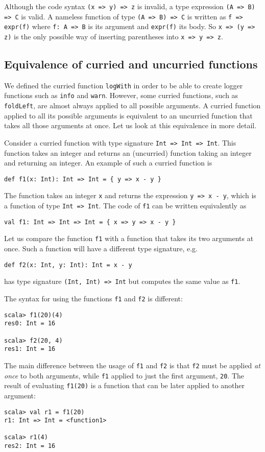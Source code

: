 Although the code syntax \lstinline!(x => y) => z! is invalid, a
type expression \lstinline!(A => B) => C! is valid. A nameless function
of type \lstinline!(A => B) => C! is written as \lstinline!f => expr(f)!
where \lstinline!f: A => B! is its argument and \lstinline!expr(f)!
its body. So \lstinline!x => (y => z)! is the only possible way of
inserting parentheses into \lstinline!x => y => z!.

\subsection{Equivalence of curried and uncurried functions}

We defined the curried function \lstinline!logWith! in order to be
able to create logger functions such as \lstinline!info! and \lstinline!warn!.
However, some curried functions, such as \lstinline!foldLeft!, are
almost always applied to all possible arguments. A curried function
applied to all its possible arguments is equivalent to an uncurried
function that takes all those arguments at once. Let us look at this
equivalence in more detail.

Consider a curried function with type signature \lstinline!Int => Int => Int!.
This function takes an integer and returns an (uncurried) function
taking an integer and returning an integer. An example of such a curried
function is
\begin{lstlisting}
def f1(x: Int): Int => Int = { y => x - y }
\end{lstlisting}

The function takes an integer \lstinline!x! and returns the expression
\lstinline!y => x - y!, which is a function of type \lstinline!Int => Int!.
The code of \lstinline!f1! can be written equivalently as
\begin{lstlisting}
val f1: Int => Int => Int = { x => y => x - y }
\end{lstlisting}

Let us compare the function \lstinline!f1! with a function that takes
its two arguments at once. Such a function will have a different type
signature, e.g.
\begin{lstlisting}
def f2(x: Int, y: Int): Int = x - y
\end{lstlisting}
has type signature \lstinline!(Int, Int) => Int! but computes the
same value as \lstinline!f1!.

The syntax for using the functions \lstinline!f1! and \lstinline!f2!
is different:
\begin{lstlisting}
scala> f1(20)(4)
res0: Int = 16

scala> f2(20, 4)
res1: Int = 16
\end{lstlisting}
The main difference between the usage of \lstinline!f1! and \lstinline!f2!
is that \lstinline!f2! must be applied \emph{at once} to both arguments,
while \lstinline!f1! applied to just the first argument, \lstinline!20!.
The result of evaluating \lstinline!f1(20)! is a function that can
be later applied to another argument:
\begin{lstlisting}
scala> val r1 = f1(20)
r1: Int => Int = <function1> 

scala> r1(4)
res2: Int = 16
\end{lstlisting}


